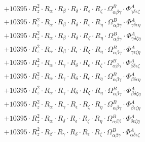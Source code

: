 \documentclass{article}
\begin{document}
\begin{subequations}
\begin{gather}
\begin{array}{c}
 \\[0.2em] 		 + 10395 \cdot R_{z}^{2} \cdot R_{\alpha{}} \cdot R_{\beta{}} \cdot R_{\delta{}} \cdot R_{\epsilon{}} \cdot R_{\zeta{}} \cdot \Omega{}^{B}_{\alpha{}\beta{}\gamma{}} \cdot \Phi{}^{A}_{\gamma{}\delta{}\epsilon{}\zeta{}} 
 \\[0.2em] 		 + 10395 \cdot R_{z}^{2} \cdot R_{\alpha{}} \cdot R_{\beta{}} \cdot R_{\delta{}} \cdot R_{\epsilon{}} \cdot R_{\eta{}} \cdot \Omega{}^{B}_{\alpha{}\beta{}\gamma{}} \cdot \Phi{}^{A}_{\gamma{}\delta{}\epsilon{}\eta{}} 
 \\[0.2em] 		 + 10395 \cdot R_{z}^{2} \cdot R_{\alpha{}} \cdot R_{\beta{}} \cdot R_{\delta{}} \cdot R_{\zeta{}} \cdot R_{\eta{}} \cdot \Omega{}^{B}_{\alpha{}\beta{}\gamma{}} \cdot \Phi{}^{A}_{\gamma{}\delta{}\zeta{}\eta{}} 
 \\[0.2em] 		 + 10395 \cdot R_{z}^{2} \cdot R_{\alpha{}} \cdot R_{\beta{}} \cdot R_{\epsilon{}} \cdot R_{\zeta{}} \cdot R_{\eta{}} \cdot \Omega{}^{B}_{\alpha{}\beta{}\gamma{}} \cdot \Phi{}^{A}_{\gamma{}\epsilon{}\zeta{}\eta{}} 
 \\[0.2em] 		 + 10395 \cdot R_{z}^{2} \cdot R_{\alpha{}} \cdot R_{\gamma{}} \cdot R_{\delta{}} \cdot R_{\epsilon{}} \cdot R_{\zeta{}} \cdot \Omega{}^{B}_{\alpha{}\beta{}\gamma{}} \cdot \Phi{}^{A}_{\beta{}\delta{}\epsilon{}\zeta{}} 
 \\[0.2em] 		 + 10395 \cdot R_{z}^{2} \cdot R_{\alpha{}} \cdot R_{\gamma{}} \cdot R_{\delta{}} \cdot R_{\epsilon{}} \cdot R_{\eta{}} \cdot \Omega{}^{B}_{\alpha{}\beta{}\gamma{}} \cdot \Phi{}^{A}_{\beta{}\delta{}\epsilon{}\eta{}} 
 \\[0.2em] 		 + 10395 \cdot R_{z}^{2} \cdot R_{\alpha{}} \cdot R_{\gamma{}} \cdot R_{\delta{}} \cdot R_{\zeta{}} \cdot R_{\eta{}} \cdot \Omega{}^{B}_{\alpha{}\beta{}\gamma{}} \cdot \Phi{}^{A}_{\beta{}\delta{}\zeta{}\eta{}} 
 \\[0.2em] 		 + 10395 \cdot R_{z}^{2} \cdot R_{\alpha{}} \cdot R_{\gamma{}} \cdot R_{\epsilon{}} \cdot R_{\zeta{}} \cdot R_{\eta{}} \cdot \Omega{}^{B}_{\alpha{}\beta{}\gamma{}} \cdot \Phi{}^{A}_{\beta{}\epsilon{}\zeta{}\eta{}} 
 \\[0.2em] 		 + 10395 \cdot R_{z}^{2} \cdot R_{\alpha{}} \cdot R_{\delta{}} \cdot R_{\epsilon{}} \cdot R_{\zeta{}} \cdot R_{\eta{}} \cdot \Omega{}^{B}_{\alpha{}\beta{}\beta{}} \cdot \Phi{}^{A}_{\delta{}\epsilon{}\zeta{}\eta{}} 
 \\[0.2em] 		 + 10395 \cdot R_{z}^{2} \cdot R_{\beta{}} \cdot R_{\gamma{}} \cdot R_{\delta{}} \cdot R_{\epsilon{}} \cdot R_{\zeta{}} \cdot \Omega{}^{B}_{\alpha{}\beta{}\gamma{}} \cdot \Phi{}^{A}_{\alpha{}\delta{}\epsilon{}\zeta{}} 

\end{array}
\end{gather}
\end{subequations}
\end{document}

